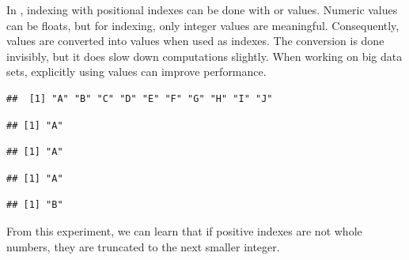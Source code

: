 \documentclass[krantz2]{krantz}\usepackage{knitr}
\begin{document}
\begin{explainbox}\label{box:vec:sort}
In \Rlang, indexing with positional indexes can be done with  or  values. Numeric values can be floats, but for indexing, only integer values are meaningful. Consequently,  values are converted into  values when used as indexes. The conversion is done invisibly, but it does slow down computations slightly. When working on big data sets, explicitly using  values can improve performance.

\begin{knitrout}\footnotesize
{}\color{fgcolor}\begin{kframe}
\begin{alltt}
 \hlkwb{<-} \hlstd{LETTERS[}\hlopt{:}\hlstd{]}
\end{alltt}
\begin{verbatim}
##  [1] "A" "B" "C" "D" "E" "F" "G" "H" "I" "J"
\end{verbatim}
\begin{alltt}
\hlstd{b[}\hlstd{]}
\end{alltt}
\begin{verbatim}
## [1] "A"
\end{verbatim}
\begin{alltt}
\hlstd{b[}\hlstd{]}
\end{alltt}
\begin{verbatim}
## [1] "A"
\end{verbatim}
\begin{alltt}
\hlstd{b[}\hlstd{]} 
\end{alltt}
\begin{verbatim}
## [1] "A"
\end{verbatim}
\begin{alltt}
\hlstd{b[}\hlstd{]}
\end{alltt}
\begin{verbatim}
## [1] "B"
\end{verbatim}
\end{kframe}
\end{knitrout}

From this experiment, we can learn that if positive indexes are not whole numbers, they are truncated to the next smaller integer.


\end{explainbox}
\end{document}
